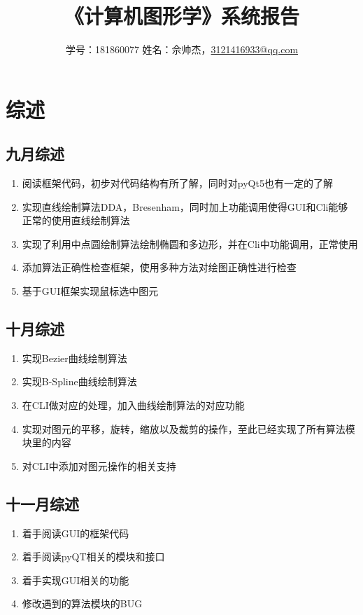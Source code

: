 \documentclass[a4paper,UTF8]{article}
\theoremstyle{definition}
\begin{document}
\title{\textbf{《计算机图形学》系统报告}}
\author{学号：181860077 姓名：佘帅杰，\href{mailto:3121416933@qq.com}{3121416933@qq.com}}
\maketitle

\section{综述}
\subsection{九月综述}
\begin{enumerate}
    \item 阅读框架代码，初步对代码结构有所了解，同时对pyQt5也有一定的了解
    
    \item 实现直线绘制算法DDA，Bresenham，同时加上功能调用使得GUI和Cli能够
    正常的使用直线绘制算法
    
    \item 实现了利用中点圆绘制算法绘制椭圆和多边形，并在Cli中功能调用，正常使用

    \item 添加算法正确性检查框架，使用多种方法对绘图正确性进行检查
    
    \item 基于GUI框架实现鼠标选中图元
\end{enumerate}

\subsection{十月综述}
\begin{enumerate}
    \item 实现Bezier曲线绘制算法
    
    \item 实现B-Spline曲线绘制算法
    
    \item 在CLI做对应的处理，加入曲线绘制算法的对应功能

    \item 实现对图元的平移，旋转，缩放以及裁剪的操作，至此已经实现了所有算法模块里的内容
    
    \item 对CLI中添加对图元操作的相关支持
\end{enumerate}

\subsection{十一月综述}
\begin{enumerate}
    \item 着手阅读GUI的框架代码
    
    \item 着手阅读pyQT相关的模块和接口
    
    \item 着手实现GUI相关的功能
    
    \item 修改遇到的算法模块的BUG
\end{enumerate}
\end{document}
